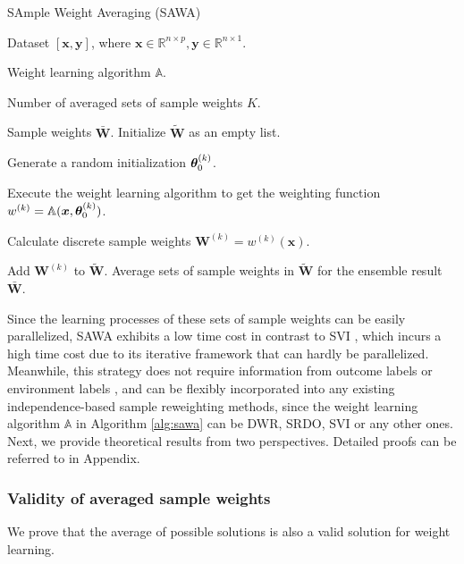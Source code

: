 \begin{algorithm}[t]
\caption{SAmple Weight Averaging (SAWA)} \label{alg:sawa}
\begin{algorithmic}
    \item Dataset $[\boldsymbol{x}, \boldsymbol{y}]$, where $\boldsymbol{x}\in \mathbb{R}^{n\times p}, \boldsymbol{y}\in \mathbb{R}^{n\times 1}$. 
    \item Weight learning algorithm $\mathbb{A}$.  
    \item Number of averaged sets of sample weights $K$. 
    
     Sample weights $\bar{\boldsymbol{W}}$. 
    \STATE Initialize $\tilde{\boldsymbol{W}}$ as an empty list.
        \item Generate a random initialization $\boldsymbol{\theta}_0^{(k)}$. 
        \item Execute the weight learning algorithm to get the weighting function $w^{(k)}=\mathbb{A}(\boldsymbol{x}, \boldsymbol{\theta}_0^{(k)})$. 
        \item Calculate discrete sample weights $\boldsymbol{W}^{(k)}=w^{(k)}(\boldsymbol{x})$. 
        \item Add $\boldsymbol{W}^{(k)}$ to $\tilde{\boldsymbol{W}}$. 
    \ENDFOR
    \STATE Average sets of sample weights in $\tilde{\boldsymbol{W}}$ for the ensemble result $\bar{\boldsymbol{W}}$. 
\end{algorithmic}
\end{algorithm}



Since the learning processes of these sets of sample weights can be easily parallelized, SAWA exhibits a low time cost in contrast to SVI \citep{yu2023stable}, which incurs a high time cost due to its iterative framework that can hardly be parallelized. 
Meanwhile, this strategy does not require information from outcome labels \citep{yu2023stable} or environment labels \citep{shen2020stable2}, and can be flexibly incorporated into any existing independence-based sample reweighting methods, since the weight learning algorithm $\mathbb{A}$ in Algorithm \ref{alg:sawa} can be DWR, SRDO, SVI or any other ones. 
Next, we provide theoretical results from two perspectives. Detailed proofs can be referred to in Appendix. 

\subsubsection{Validity of averaged sample weights}
\label{sec:validity}
We prove that the average of possible solutions is also a valid solution for weight learning. 

